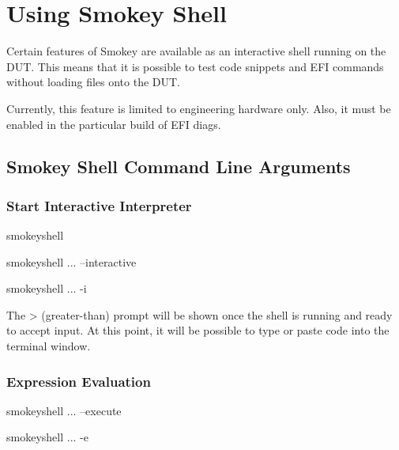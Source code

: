 
\section{Using Smokey Shell}

Certain features of Smokey are available as an interactive shell running on the
DUT.  This means that it is possible to test code snippets and EFI commands
without loading files onto the DUT.

Currently, this feature is limited to engineering hardware only.  Also, it must
be enabled in the particular build of EFI diags.

\subsection{Smokey Shell Command Line Arguments}

\subsubsection{Start Interactive Interpreter}

\begin{CommandLine}
smokeyshell
\end{CommandLine}

\begin{CommandLine}
smokeyshell ... --interactive
\end{CommandLine}

\begin{CommandLine}
smokeyshell ... -i
\end{CommandLine}

The > (greater-than) prompt will be shown once the shell is running and ready
to accept input.  At this point, it will be possible to type or paste code into
the terminal window.

\subsubsection{Expression Evaluation}

\begin{CommandLine}
smokeyshell ... --execute ~~
\end{CommandLine}

\begin{CommandLine}
smokeyshell ... -e ~~
\end{CommandLine}

